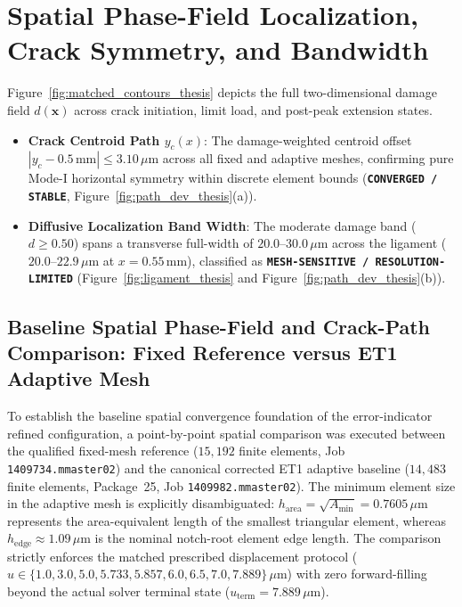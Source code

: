 \section{Spatial Phase-Field Localization, Crack Symmetry, and Bandwidth}
\label{sec:phase_field_contours_and_symmetry}

Figure~\ref{fig:matched_contours_thesis} depicts the full two-dimensional damage field $d(\mathbf{x})$ across crack initiation, limit load, and post-peak extension states.
\begin{itemize}
    \item \textbf{Crack Centroid Path $y_c(x)$}: The damage-weighted centroid offset $|y_c - 0.5\,\text{mm}| \le 3.10\,\mu\text{m}$ across all fixed and adaptive meshes, confirming pure Mode-I horizontal symmetry within discrete element bounds (\textbf{\texttt{CONVERGED / STABLE}}, Figure~\ref{fig:path_dev_thesis}(a)).
    \item \textbf{Diffusive Localization Band Width}: The moderate damage band ($d \ge 0.50$) spans a transverse full-width of $20.0$--$30.0\,\mu\text{m}$ across the ligament ($20.0$--$22.9\,\mu\text{m}$ at $x = 0.55\,\text{mm}$), classified as \textbf{\texttt{MESH-SENSITIVE / RESOLUTION-LIMITED}} (Figure~\ref{fig:ligament_thesis} and Figure~\ref{fig:path_dev_thesis}(b)).
\end{itemize}

\subsection{Baseline Spatial Phase-Field and Crack-Path Comparison: Fixed Reference versus ET1 Adaptive Mesh}
\label{sec:baseline_spatial_ref_vs_et1_thesis}

To establish the baseline spatial convergence foundation of the error-indicator refined configuration, a point-by-point spatial comparison was executed between the qualified fixed-mesh reference ($15{,}192$ finite elements, Job \texttt{1409734.mmaster02}) and the canonical corrected ET1 adaptive baseline ($14{,}483$ finite elements, Package~25, Job \texttt{1409982.mmaster02}). The minimum element size in the adaptive mesh is explicitly disambiguated: $h_{\mathrm{area}} = \sqrt{A_{\min}} = 0.7605\,\mu\mathrm{m}$ represents the area-equivalent length of the smallest triangular element, whereas $h_{\mathrm{edge}} \approx 1.09\,\mu\mathrm{m}$ is the nominal notch-root element edge length. The comparison strictly enforces the matched prescribed displacement protocol ($u \in \{1.0, 3.0, 5.0, 5.733, 5.857, 6.0, 6.5, 7.0, 7.889\}\,\mu\mathrm{m}$) with zero forward-filling beyond the actual solver terminal state ($u_{\mathrm{term}} = 7.889\,\mu\mathrm{m}$).

